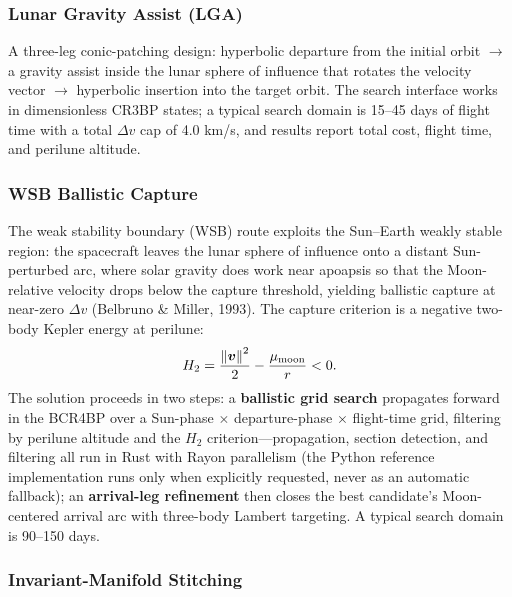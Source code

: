 \subsubsection{Lunar Gravity Assist (LGA)}

A three-leg conic-patching design: hyperbolic departure from the initial
orbit $\to$ a gravity assist inside the lunar sphere of influence that
rotates the velocity vector $\to$ hyperbolic insertion into the target orbit.
The search interface works in dimensionless CR3BP states; a typical search
domain is 15--45 days of flight time with a total $\Delta v$ cap of
4.0 km/s, and results report total cost, flight time, and perilune altitude.

\subsubsection{WSB Ballistic Capture}

The weak stability boundary (WSB) route exploits the Sun--Earth weakly stable
region: the spacecraft leaves the lunar sphere of influence onto a distant
Sun-perturbed arc, where solar gravity does work near apoapsis so that the
Moon-relative velocity drops below the capture threshold, yielding ballistic
capture at near-zero $\Delta v$ (Belbruno \& Miller, 1993). The capture
criterion is a negative two-body Kepler energy at perilune:
\begin{equation}
  H_2 = \frac{\left\lVert \bm{v} \right\rVert^2}{2} - \frac{\mu_{\mathrm{moon}}}{r} < 0 .
\end{equation}
The solution proceeds in two steps: a \textbf{ballistic grid search}
propagates forward in the BCR4BP over a Sun-phase $\times$ departure-phase
$\times$ flight-time grid, filtering by perilune altitude and the $H_2$
criterion---propagation, section detection, and filtering all run in Rust
with Rayon parallelism (the Python reference implementation runs only when
explicitly requested, never as an automatic fallback); an \textbf{arrival-leg
refinement} then closes the best candidate's Moon-centered arrival arc with
three-body Lambert targeting. A typical search domain is 90--150 days.

\subsubsection{Invariant-Manifold Stitching}

